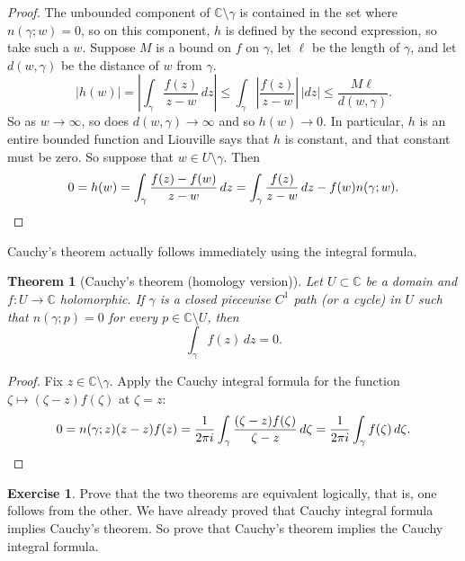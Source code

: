 \documentclass[12pt,openany]{book}
\newcommand{\sabs}[1]{\lvert {#1} \rvert}
\newcommand{\abs}[1]{\left\lvert {#1} \right\rvert}
\newcommand{\C}{{\mathbb{C}}}
\theoremstyle{plain}
\newtheorem{thm}{Theorem}[section]
\theoremstyle{remark}
\theoremstyle{definition}
\newenvironment{exbox}{%
    \def\FrameCommand{\vrule width 1pt \relax\hspace{10pt}}%
    \MakeFramed{\advance\hsize-\width\FrameRestore}%
}{%
    \endMakeFramed
}
\theoremstyle{exercise}
\newtheorem{exercise}{Exercise}[section]
\theoremstyle{example}
\begin{document}
\begin{proof}
The unbounded component of $\C \setminus \gamma$ is contained in the
set where $n(\gamma;w) = 0$, so on this component, $h$ is defined by the
second expression, so take such a $w$.
Suppose $M$ is a bound on $f$ on $\gamma$, let $\ell$ be the length of
$\gamma$, and let $d(w,\gamma)$ be the distance of $w$ from $\gamma$.
\begin{equation*}
\sabs{h(w)}
=
\abs{
\int_\gamma \frac{f(z)}{z-w} \, dz
}
\leq
\int_\gamma \abs{\frac{f(z)}{z-w}} \, \sabs{dz}
\leq
\frac{M \ell}{d(w,\gamma)} .
\end{equation*}
So as $w \to \infty$, so does $d(w,\gamma) \to \infty$ and so $h(w) \to 0$.
In particular, $h$ is an entire bounded function and
Liouville says that $h$ is constant, and that constant must be zero.
So suppose that $w \in U \setminus \gamma$.  Then
\begin{equation*}
0 = h(w) =
\int_\gamma \frac{f(z)-f(w)}{z-w} \, dz
=
\int_\gamma \frac{f(z)}{z-w} \, dz
-
f(w) n(\gamma;w) . \qedhere
\end{equation*}
\end{proof}

Cauchy's theorem actually follows immediately using the integral formula.

\begin{thm}[Cauchy's theorem (homology version)]
%
\label{thm:CThomology}%
Let $U \subset \C$ be a domain and $f \colon U \to \C$ holomorphic.  If
$\gamma$ is a
closed
piecewise $C^1$ path (or a cycle) in $U$ such that $n(\gamma;p) = 0$ for
every $p \in \C \setminus U$, then
\begin{equation*}
\int_\gamma f(z) \, dz = 0 .
\end{equation*}
\end{thm}

\begin{proof}
Fix $z \in \C \setminus \gamma$.  Apply 
the Cauchy integral formula for the function $\zeta \mapsto
(\zeta-z)f(\zeta)$ at $\zeta=z$:
\begin{equation*}
0 = n(\gamma;z) (z-z)f(z) =
\frac{1}{2\pi i} \int_\gamma \frac{(\zeta-z)f(\zeta)}{\zeta-z} \, d\zeta
=
\frac{1}{2\pi i} \int_\gamma f(\zeta) \, d\zeta . \qedhere
\end{equation*}
\end{proof}

\begin{exbox}
\begin{exercise}
Prove that the two theorems are equivalent logically, that is, one follows
from the other.  We have already proved that Cauchy integral formula
implies Cauchy's theorem.  So prove that
Cauchy's theorem implies the Cauchy integral formula.
\end{exercise}
\end{exbox}
\end{document}
